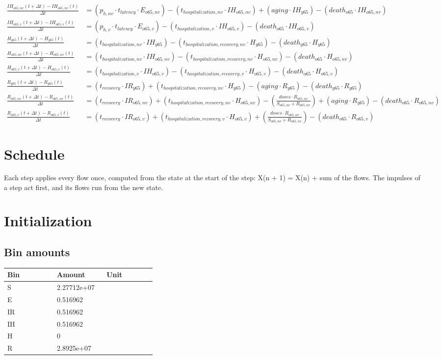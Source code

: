 \documentclass{article}
\begin{document}
\begin{align*}
\frac{IH_{o65,nv}(t+\Delta t) - IH_{o65,nv}(t)}{\Delta t} &= (p_{h,nv} \cdot t_{latency} \cdot E_{o65,nv}) - (t_{hospitalization,nv} \cdot IH_{o65,nv}) + (aging \cdot IH_{y65}) - (death_{o65} \cdot IH_{o65,nv}) \\
\frac{IH_{o65,v}(t+\Delta t) - IH_{o65,v}(t)}{\Delta t} &= (p_{h,v} \cdot t_{latency} \cdot E_{o65,v}) - (t_{hospitalization,v} \cdot IH_{o65,v}) - (death_{o65} \cdot IH_{o65,v}) \\
\frac{H_{y65}(t+\Delta t) - H_{y65}(t)}{\Delta t} &= (t_{hospitalization,nv} \cdot IH_{y65}) - (t_{hospitalization,recovery,nv} \cdot H_{y65}) - (death_{y65} \cdot H_{y65}) \\
\frac{H_{o65,nv}(t+\Delta t) - H_{o65,nv}(t)}{\Delta t} &= (t_{hospitalization,nv} \cdot IH_{o65,nv}) - (t_{hospitalization,recovery,nv} \cdot H_{o65,nv}) - (death_{o65} \cdot H_{o65,nv}) \\
\frac{H_{o65,v}(t+\Delta t) - H_{o65,v}(t)}{\Delta t} &= (t_{hospitalization,v} \cdot IH_{o65,v}) - (t_{hospitalization,recovery,v} \cdot H_{o65,v}) - (death_{o65} \cdot H_{o65,v}) \\
\frac{R_{y65}(t+\Delta t) - R_{y65}(t)}{\Delta t} &= (t_{recovery} \cdot IR_{y65}) + (t_{hospitalization,recovery,nv} \cdot H_{y65}) - (aging \cdot R_{y65}) - (death_{y65} \cdot R_{y65}) \\
\frac{R_{o65,nv}(t+\Delta t) - R_{o65,nv}(t)}{\Delta t} &= (t_{recovery} \cdot IR_{o65,nv}) + (t_{hospitalization,recovery,nv} \cdot H_{o65,nv}) - (\frac{doses \cdot R_{o65,nv}}{S_{o65,nv} + R_{o65,nv}}) + (aging \cdot R_{y65}) - (death_{o65} \cdot R_{o65,nv}) \\
\frac{R_{o65,v}(t+\Delta t) - R_{o65,v}(t)}{\Delta t} &= (t_{recovery} \cdot IR_{o65,v}) + (t_{hospitalization,recovery,v} \cdot H_{o65,v}) + (\frac{doses \cdot R_{o65,nv}}{S_{o65,nv} + R_{o65,nv}}) - (death_{o65} \cdot R_{o65,v})
\end{align*}
\section*{Schedule}
Each step applies every flow once, computed from the state at the start of the step: X(n + 1) = X(n) + sum of the flows. The impulses of a step act first, and its flows run from the new state.

\section*{Initialization}
\subsection*{Bin amounts}
\begin{longtable}{p{0.3\linewidth}p{0.3\linewidth}p{0.3\linewidth}}
Bin & Amount & Unit \\
\hline
\endhead
S & 2.27712e+07 &  \\
E & 0.516962 &  \\
IR & 0.516962 &  \\
IH & 0.516962 &  \\
H & 0 &  \\
R & 2.8925e+07 &  \\
\end{longtable}
\end{document}
